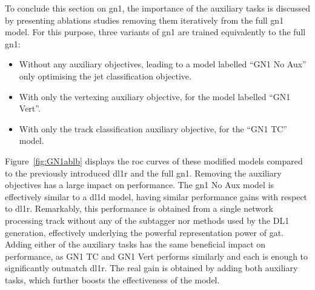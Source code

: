 To conclude this section on \gls{gn1}, the importance of the auxiliary tasks is discussed by presenting ablations studies removing them iteratively from the full \gls{gn1} model. For this purpose, three variants of \gls{gn1} are trained equivalently to the full \gls{gn1}:
\begin{itemize}
  \item Without any auxiliary objectives, leading to a model labelled ``GN1 No Aux'' only optimising the jet classification objective.
  \item With only the vertexing auxiliary objective, for the model labelled ``GN1 Vert''.
  \item With only the track classification auxiliary objective, for the ``GN1 TC'' model.
\end{itemize}
Figure~\ref{fig:GN1ablb} displays the \gls{roc} curves of these modified models compared to the previously introduced \gls{dl1r} and the full \gls{gn1}. Removing the auxiliary objectives has a large impact on performance. The \gls{gn1} No Aux model is effectively similar to a \gls{dl1d} model, having similar performance gains with respect to \gls{dl1r}. Remarkably, this performance is obtained from a single network processing track without any of the subtagger nor methods used by the DL1 generation, effectively underlying the powerful representation power of \gls{gat}. Adding either of the auxiliary tasks has the same beneficial impact on performance, as GN1 TC and GN1 Vert performs similarly and each is enough to significantly outmatch \gls{dl1r}. The real gain is obtained by adding both auxiliary tasks, which further boosts the effectiveness of the model.\\

